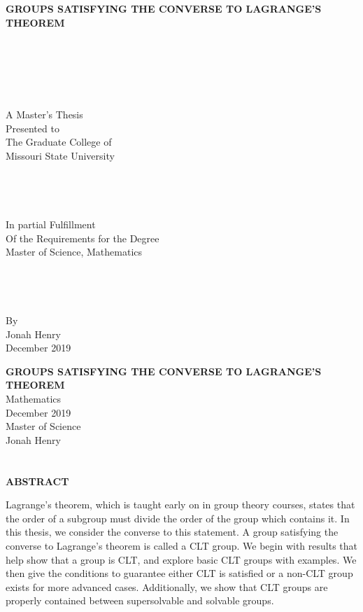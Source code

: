 \documentclass[12pt]{report}
\theoremstyle{newthm}
\begin{document}
\let \savenumberline \numberline
\def \numberline#1{\savenumberline{#1.}}

\renewcommand{\contentsname}{TABLE OF CONTENTS}
\renewcommand{\cftchapfont}{\mdseries}
\renewcommand{\cftchappagefont}{\mdseries}


\newpage

%
\thispagestyle{empty}
\centerline{\textbf{GROUPS SATISFYING THE CONVERSE TO LAGRANGE'S THEOREM}}
\begin{center}
    \\~\\~\\~\\~\\ 
    A Master's Thesis \\
    Presented to \\
    The Graduate College of \\
    Missouri State University
    \\~\\~\\~\\~\\
    In partial Fulfillment \\
    Of the Requirements for the Degree\\
    Master of Science, Mathematics 
    \\~\\~\\~\\~\\
    By\\
    Jonah Henry\\
    December 2019
\end{center}
\newpage
% 
\noindent\textbf{GROUPS SATISFYING THE CONVERSE TO LAGRANGE'S \\\noindent THEOREM}\\
\noindent Mathematics\\
\noindent December 2019\\
\noindent Master of Science\\
\noindent Jonah Henry \\
\\~\\
\noindent\textbf{ABSTRACT}\bigskip
\begin{spacing}{1}
\noindent  Lagrange’s theorem, which is taught early on in group theory courses, states that the order of a subgroup must divide the order of the group which contains it. In this thesis, we consider the converse to this statement. A group satisfying the converse to Lagrange's theorem is called a CLT group. We begin with results that help show that a group is CLT, and explore basic CLT groups with examples. We then give the conditions to guarantee either CLT is satisfied or a non-CLT group exists for more advanced cases. Additionally, we show that CLT groups are properly contained between supersolvable and solvable groups.
\end{spacing}
\end{document}
